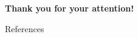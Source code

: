 \documentclass{beamer}
\begin{document}
	
	\begin{frame}[plain]
		\centering
		\vfill
		{\Huge\bfseries\color{themecolor}Thank you for your attention!}
		\vfill
	\end{frame}
	
	
	\begin{frame}[shrink=20]{References}
		\tiny
		\nocite{*}
		
		
	\end{frame}
	
	
\end{document}
